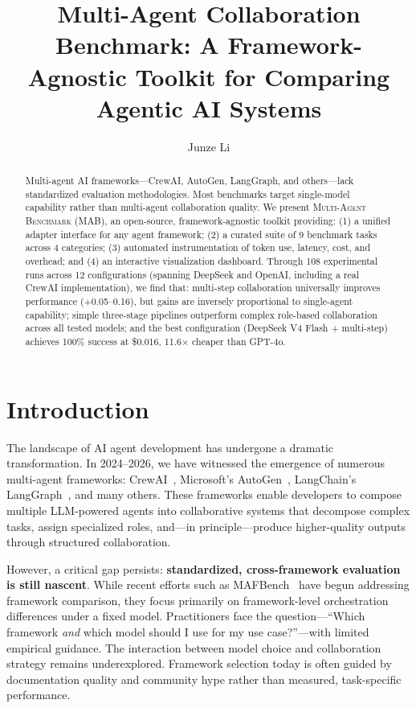 \documentclass[sigconf,nonacm]{acmart}
\title{Multi-Agent Collaboration Benchmark: A Framework-Agnostic Toolkit for Comparing Agentic AI Systems}
\author{Junze Li}
\affiliation{%
  \institution{Nanjing University}
  \city{Nanjing}
  \country{China}
}
\begin{document}
\begin{abstract}
Multi-agent AI frameworks—CrewAI, AutoGen, LangGraph, and others—lack standardized evaluation methodologies. Most benchmarks target single-model capability rather than multi-agent collaboration quality. We present \textsc{Multi-Agent Benchmark} (MAB), an open-source, framework-agnostic toolkit providing: (1) a unified adapter interface for any agent framework; (2) a curated suite of 9 benchmark tasks across 4 categories; (3) automated instrumentation of token use, latency, cost, and overhead; and (4) an interactive visualization dashboard. Through 108 experimental runs across 12 configurations (spanning DeepSeek and OpenAI, including a real CrewAI implementation), we find that: multi-step collaboration universally improves performance (+0.05--0.16), but gains are inversely proportional to single-agent capability; simple three-stage pipelines outperform complex role-based collaboration across all tested models; and the best configuration (DeepSeek V4 Flash + multi-step) achieves 100\% success at \$0.016, 11.6$\times$ cheaper than GPT-4o.
\end{abstract}


\maketitle

\section{Introduction}

The landscape of AI agent development has undergone a dramatic transformation. In 2024--2026, we have witnessed the emergence of numerous multi-agent frameworks: CrewAI~\cite{crewai2024}, Microsoft's AutoGen~\cite{wu2023autogen}, LangChain's LangGraph~\cite{langgraph2024}, and many others. These frameworks enable developers to compose multiple LLM-powered agents into collaborative systems that decompose complex tasks, assign specialized roles, and—in principle—produce higher-quality outputs through structured collaboration.

However, a critical gap persists: \textbf{standardized, cross-framework evaluation is still nascent}. While recent efforts such as MAFBench~\cite{mafbench2026} have begun addressing framework comparison, they focus primarily on framework-level orchestration differences under a fixed model. Practitioners face the question—``Which framework \emph{and} which model should I use for my use case?''—with limited empirical guidance. The interaction between model choice and collaboration strategy remains underexplored. Framework selection today is often guided by documentation quality and community hype rather than measured, task-specific performance.
\end{document}
